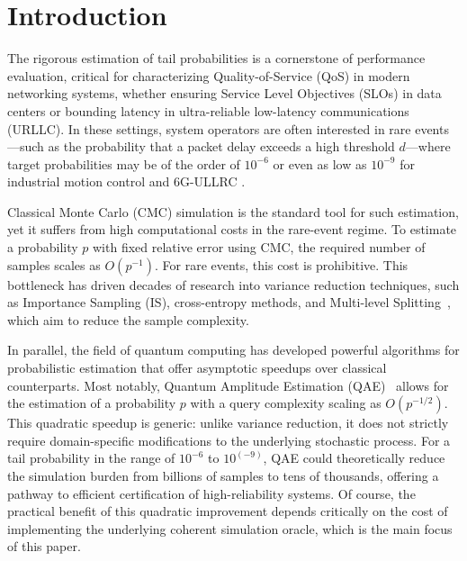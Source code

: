 \documentclass[11pt]{article}
\begin{document}
\section{Introduction}
The rigorous estimation of tail probabilities is a cornerstone of performance evaluation, critical for characterizing Quality-of-Service (QoS) in modern networking systems, whether ensuring Service Level Objectives (SLOs) in data centers or bounding latency in ultra-reliable low-latency communications (URLLC). In these settings, system operators are often interested in rare events—such as the probability that a packet delay exceeds a high threshold $d$—where target probabilities may be of the order of $10^{-6}$ or even as low as $10^{-9}$ for industrial motion control and 6G-ULLRC \cite{saad2019vision,popovski2022perspective,3gpp22804}.

Classical Monte Carlo (CMC) simulation is the standard tool for such estimation, yet it suffers from high computational costs in the rare-event regime. To estimate a probability $p$ with fixed relative error using CMC, the required number of samples scales as $O(p^{-1})$. For rare events, this cost is prohibitive. This bottleneck has driven decades of research into variance reduction techniques, such as Importance Sampling (IS), cross-entropy methods, and Multi-level Splitting~\cite{asmussen2007applied, asmussen2007applied, blanchet2008efficient, glasserman1999multilevel, glynn1994simulation, heidelberger1995fast}, which aim to reduce the sample complexity.

In parallel, the field of quantum computing has developed powerful algorithms for probabilistic estimation that offer asymptotic speedups over classical counterparts. Most notably, Quantum Amplitude Estimation (QAE)~\cite{brassard2002quantum} allows for the estimation of a probability $p$ with a query complexity scaling as $O(p^{-1/2})$. This quadratic speedup is generic: unlike variance reduction, it does not strictly require domain-specific modifications to the underlying stochastic process. For a tail probability in the range of $10^{-6}$ to $10^(-9)$, QAE could theoretically reduce the simulation burden from billions of samples to tens of thousands, offering a pathway to efficient certification of high-reliability systems. Of course, the practical benefit of this quadratic improvement depends critically on the cost of implementing the underlying coherent simulation oracle, which is the main focus of this paper.
\end{document}
